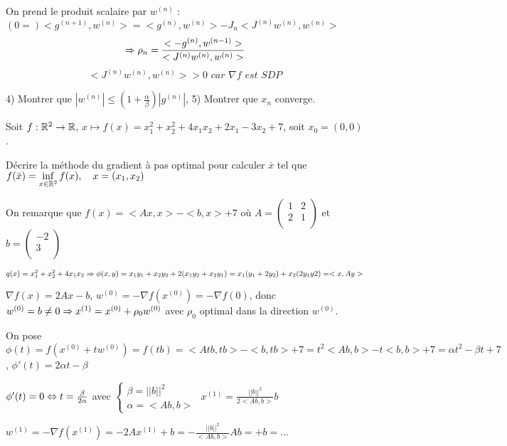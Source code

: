 On prend le produit scalaire par $w^{(n)}$ : $(0=)<g^{(n+1)},w^{(n)}>=<g^{(n)},w^{(n)}>-J_n<J^{(n)}w^{(n)},w^{(n)}>$
\[ \Rightarrow\rho_n = \frac{ <-g^{(n)},w^{(n-1)}> }{ <J^{(n)}w^{(n)},w^{(n)}>} \]
\[ <J^{(n)}w^{(n)},w^{(n)}> >0 \textit{ car } \nabla f \textit{ est SDP}\]

4) Montrer que $|w^{(n)}| \leq (1+\frac{\alpha}{\beta})|g^{(n)}|$,
5) Montrer que $x_n$ converge.

\begin{exemple}
Soit $f:\mathbb{R}^2\rightarrow\mathbb{R}$, $x\mapsto f(x)=x_1^2+x_2^2+4x_1x_2+2x_1-3x_2+7$, soit $x_0=(0,0)$.

Décrire la méthode du gradient à pas optimal pour calculer $\bar{x}$ tel que $\displaystyle f(\bar{x})=\inf_{x\in\mathbb{R}^2} f(x), \quad x=(x_1,x_2)$

On remarque que $f(x)=<Ax,x>-<b,x>+7$ où $A=\begin{pmatrix}1 & 2\\ 2 & 1\\ \end{pmatrix}$ et $b=\begin{pmatrix}-2\\ 3\\ \end{pmatrix}$

$q(x)=x_1^2+x_2^2+4x_1x_2 \Rightarrow \phi(x, y)=x_1y_1+x_2y_2+2(x_1y_2+x_2y_1)=x_1(y_1+2y_2)+x_2(2y_1y2)=<x,Ay>$

$\nabla f(x)=2Ax-b$, $w^{(0)}=-\nabla f(x^{(0)})=-\nabla f(0)$, donc $w^{(0)}=b\ne 0 \Rightarrow x^{(1)}=x^{(0)}+\rho_0w^{(0)}$ avec $\rho_0$ optimal dans la direction $w^{(0)}$.

On pose $\phi(t)=f(x^{(0)}+tw^{(0)})=f(tb)=<Atb,tb>-<b,tb>+7=t^2<Ab,b>-t<b,b>+7=\alpha t^2-\beta t+7$, $\phi'(t)=2\alpha t-\beta$

$\phi'(t)=0 \Leftrightarrow t=\frac{\beta}{2\alpha}$ avec $\begin{cases} \beta=||b||^2 \\ \alpha=<Ab,b> \end{cases}$
$x^{(1)}=\frac{||b||^2}{2<Ab,b>}b$

$w^{(1)}=-\nabla f(x^{(1)})=-2Ax^{(1)}+b=-\frac{||b||^2}{<Ab,b>}Ab=+b= ...$

\end{exemple}












